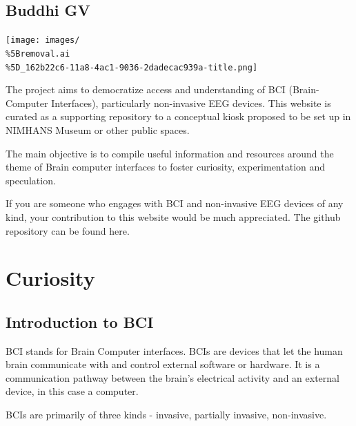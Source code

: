 \documentclass[
  letterpaper,
  DIV=11,
  numbers=noendperiod]{scrreprt}
\author{}
\date{}
\renewcommand*\contentsname{Table of contents}
\newcommand\contentsname{Table of contents}
\begin{document}
\renewcommand*\contentsname{Table of contents}
{
\hypersetup{linkcolor=}
\setcounter{tocdepth}{2}
\tableofcontents
}

\chapter{Buddhi GV}\label{buddhi-gv}

\begin{center}
\texttt{[image: images/\\\%5Bremoval.ai\\\%5D\_162b22c6-11a8-4ac1-9036-2dadecac939a-title.png]}
\end{center}

The project aims to democratize access and understanding of BCI
(Brain-Computer Interfaces), particularly non-invasive EEG devices. This
website is curated as a supporting repository to a conceptual kiosk
proposed to be set up in NIMHANS Museum or other public spaces.

The main objective is to compile useful information and resources around
the theme of Brain computer interfaces to foster curiosity,
experimentation and speculation.

If you are someone who engages with BCI and non-invasive EEG devices of
any kind, your contribution to this website would be much appreciated.
The github repository can be found here.

\part{Curiosity}

\chapter{Introduction to BCI}\label{introduction-to-bci}

BCI stands for Brain Computer interfaces. BCIs are devices that let the
human brain communicate with and control external software or hardware.
It is a communication pathway between the brain's electrical activity
and an external device, in this case a computer.

BCIs are primarily of three kinds - invasive, partially invasive,
non-invasive.
\end{document}
